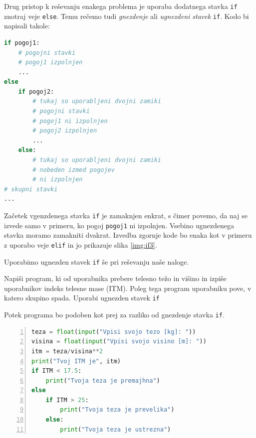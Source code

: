 Drug pristop k reševanju enakega problema je uporaba dodatnega stavka \texttt{if} znotraj veje \texttt{else}. Temu rečemo tudi \emph{gnezdenje} ali \emph{ugnezdeni stavek} \texttt{if}. Kodo bi napisali takole: \begin{lstlisting}[language=Python]
if pogoj1:
    # pogojni stavki
    # pogoj1 izpolnjen
    ...
else
    if pogoj2:
        # tukaj so uporabljeni dvojni zamiki
        # pogojni stavki
        # pogoj1 ni izpolnjen
        # pogoj2 izpolnjen
        ...
    else:
        # tukaj so uporabljeni dvojni zamiki
        # nobeden izmed pogojev
        # ni izpolnjen
# skupni stavki
...
\end{lstlisting}
Začetek vgenzdenega stavka \texttt{if} je zamaknjen enkrat, s čimer povemo, da naj se izvede samo v primeru, ko pogoj \texttt{pogoj1} ni izpolnjen. Vsebino ugnezdenega stavka moramo zamakniti dvakrat. Izvedba zgornje kode bo enaka kot v primeru z uporabo veje \texttt{elif} in jo prikazuje slika \ref{img:if3}. 

Uporabimo ugnezden stavek \texttt{if} še pri reševanju naše naloge.
\begin{zgled}
Napiši program, ki od uporabnika prebere telesno težo in višino in izpiše uporabnikov indeks telesne mase (ITM). Poleg tega program uporabniku pove, v katero skupino spada. Uporabi ugnezden stavek \texttt{if}
\end{zgled}
\begin{resitev}
Potek programa bo podoben kot prej za razliko od gnezdenje stavka \texttt{if}.
\begin{lstlisting}[language=Python,numbers=left]
teza = float(input("Vpisi svojo tezo [kg]: "))
visina = float(input("Vpisi svojo visino [m]: "))
itm = teza/visina**2
print("Tvoj ITM je", itm)
if ITM < 17.5:
    print("Tvoja teza je premajhna")
else
    if ITM > 25:
        print("Tvoja teza je prevelika")
    else:
        print("Tvoja teza je ustrezna")
\end{lstlisting}
\end{resitev}
